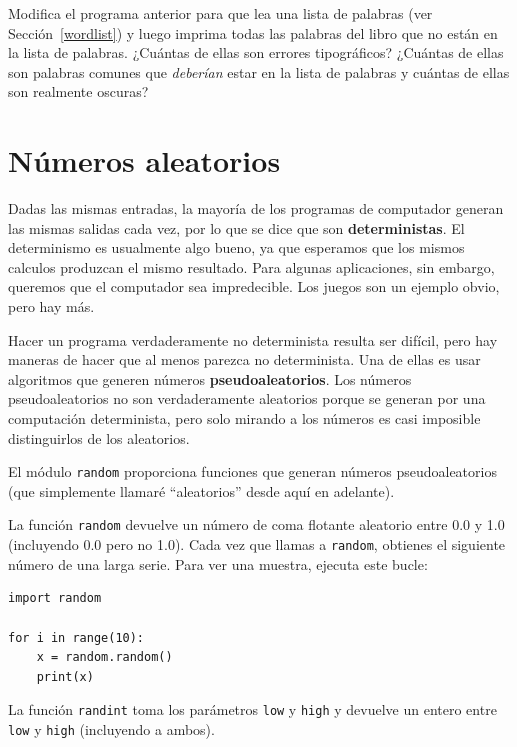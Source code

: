\documentclass[10pt]{book}
\begin{document}
\begin{exercise}

Modifica el programa anterior para que lea una lista de palabras (ver
Sección~\ref{wordlist}) y luego imprima todas las palabras del libro que
no están en la lista de palabras.  ¿Cuántas de ellas son errores tipográficos?
¿Cuántas de ellas son palabras comunes que {\em deberían} estar en la lista
de palabras y cuántas de ellas son realmente oscuras?

\end{exercise}


\section{Números aleatorios}

Dadas las mismas entradas, la mayoría de los programas de computador generan
las mismas salidas cada vez, por lo que se dice que son {\bf deterministas}.
El determinismo es usualmente algo bueno, ya que esperamos que los mismos
calculos produzcan el mismo resultado.  Para algunas aplicaciones, sin embargo,
queremos que el computador sea impredecible.  Los juegos son un ejemplo
obvio, pero hay más.

Hacer un programa verdaderamente no determinista resulta ser difícil,
pero hay maneras de hacer que al menos parezca no determinista.  Una de
ellas es usar algoritmos que generen números {\bf pseudoaleatorios}.
Los números pseudoaleatorios no son verdaderamente aleatorios porque se generan
por una computación determinista, pero solo mirando a los números
es casi imposible distinguirlos de los aleatorios.

El módulo {\tt random} proporciona funciones que generan
números pseudoaleatorios (que simplemente llamaré ``aleatorios'' desde
aquí en adelante).

La función {\tt random} devuelve un número de coma flotante aleatorio
entre 0.0 y 1.0 (incluyendo 0.0 pero no 1.0).  Cada vez que
llamas a {\tt random}, obtienes el siguiente número de una larga serie.
Para ver una muestra, ejecuta este bucle:

\begin{verbatim}
import random

for i in range(10):
    x = random.random()
    print(x)
\end{verbatim}
%
La función {\tt randint} toma los parámetros {\tt low} y
{\tt high} y devuelve un entero entre {\tt low} y
{\tt high} (incluyendo a ambos).
\end{document}
